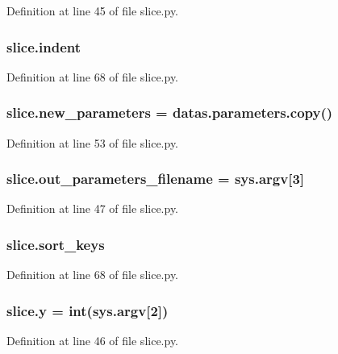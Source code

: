 Definition at line 45 of file slice.\+py.

\subsubsection[{\texorpdfstring{indent}{indent}}]{\setlength{\rightskip}{0pt plus 5cm}slice.\+indent}\hypertarget{namespaceslice_ab212c25c857f17fc36392cff92c3d93d}{}\label{namespaceslice_ab212c25c857f17fc36392cff92c3d93d}


Definition at line 68 of file slice.\+py.

\subsubsection[{\texorpdfstring{new\+\_\+parameters}{new_parameters}}]{\setlength{\rightskip}{0pt plus 5cm}slice.\+new\+\_\+parameters = datas.\+parameters.\+copy()}\hypertarget{namespaceslice_a523f634f70d01b5c0f2c7c70a28eabee}{}\label{namespaceslice_a523f634f70d01b5c0f2c7c70a28eabee}


Definition at line 53 of file slice.\+py.

\subsubsection[{\texorpdfstring{out\+\_\+parameters\+\_\+filename}{out_parameters_filename}}]{\setlength{\rightskip}{0pt plus 5cm}slice.\+out\+\_\+parameters\+\_\+filename = sys.\+argv\mbox{[}3\mbox{]}}\hypertarget{namespaceslice_acc58115186fa9eb18f9d1cbf673409aa}{}\label{namespaceslice_acc58115186fa9eb18f9d1cbf673409aa}


Definition at line 47 of file slice.\+py.

\subsubsection[{\texorpdfstring{sort\+\_\+keys}{sort_keys}}]{\setlength{\rightskip}{0pt plus 5cm}slice.\+sort\+\_\+keys}\hypertarget{namespaceslice_ae580944fe01b0f1fa0e9acbbdfda532c}{}\label{namespaceslice_ae580944fe01b0f1fa0e9acbbdfda532c}


Definition at line 68 of file slice.\+py.

\subsubsection[{\texorpdfstring{y}{y}}]{\setlength{\rightskip}{0pt plus 5cm}slice.\+y = int(sys.\+argv\mbox{[}2\mbox{]})}\hypertarget{namespaceslice_ae7917a4598035a46a8221bbf9464973a}{}\label{namespaceslice_ae7917a4598035a46a8221bbf9464973a}


Definition at line 46 of file slice.\+py.

